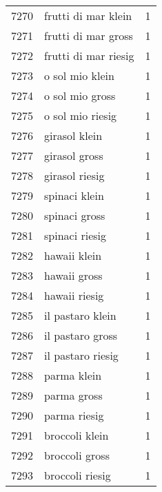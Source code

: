 \begin{tabular}{llr}
7270 &                                frutti di mar klein &      1 \\
7271 &                                frutti di mar gross &      1 \\
7272 &                               frutti di mar riesig &      1 \\
7273 &                                    o sol mio klein &      1 \\
7274 &                                    o sol mio gross &      1 \\
7275 &                                   o sol mio riesig &      1 \\
7276 &                                      girasol klein &      1 \\
7277 &                                      girasol gross &      1 \\
7278 &                                     girasol riesig &      1 \\
7279 &                                      spinaci klein &      1 \\
7280 &                                      spinaci gross &      1 \\
7281 &                                     spinaci riesig &      1 \\
7282 &                                       hawaii klein &      1 \\
7283 &                                       hawaii gross &      1 \\
7284 &                                      hawaii riesig &      1 \\
7285 &                                   il pastaro klein &      1 \\
7286 &                                   il pastaro gross &      1 \\
7287 &                                  il pastaro riesig &      1 \\
7288 &                                        parma klein &      1 \\
7289 &                                        parma gross &      1 \\
7290 &                                       parma riesig &      1 \\
7291 &                                     broccoli klein &      1 \\
7292 &                                     broccoli gross &      1 \\
7293 &                                    broccoli riesig &      1 \\

\end{tabular}

